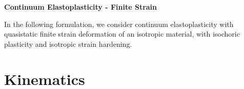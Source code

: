 \documentclass[10pt]{article}
\begin{document}
\def\Bomega{\mbox{\boldmath$\omega$}}
\def\Bvarepsilon{\mbox{\boldmath$\varepsilon$}}
\def\Bvartheta{\mbox{\boldmath$\vartheta$}}
\def\Bvarpi{\mbox{\boldmath$\varpi$}}
\def\Bvarrho{\mbox{\boldmath$\varrho$}}
\def\Bvarsigma{\mbox{\boldmath$\varsigma$}}
\def\Bvarphi{\mbox{\boldmath$\varphi$}}
\def\bone{\mathbf{1}}
\def\bzero{\mathbf{0}}
\def\bA{\mbox{\boldmath$ A$}}
\def\bB{\mbox{\boldmath$ B$}}
\def\bC{\mbox{\boldmath$ C$}}
\def\bD{\mbox{\boldmath$ D$}}
\def\bE{\mbox{\boldmath$ E$}}
\def\bF{\mbox{\boldmath$ F$}}
\def\bG{\mbox{\boldmath$ G$}}
\def\bH{\mbox{\boldmath$ H$}}
\def\bI{\mbox{\boldmath$ I$}}
\def\bJ{\mbox{\boldmath$ J$}}
\def\bK{\mbox{\boldmath$ K$}}
\def\bL{\mbox{\boldmath$ L$}}
\def\bM{\mbox{\boldmath$ M$}}
\def\bN{\mbox{\boldmath$ N$}}
\def\bO{\mbox{\boldmath$ O$}}
\def\bP{\mbox{\boldmath$ P$}}
\def\bQ{\mbox{\boldmath$ Q$}}
\def\bR{\mbox{\boldmath$ R$}}
\def\bS{\mbox{\boldmath$ S$}}
\def\bT{\mbox{\boldmath$ T$}}
\def\bU{\mbox{\boldmath$ U$}}
\def\bV{\mbox{\boldmath$ V$}}
\def\bW{\mbox{\boldmath$ W$}}
\def\bX{\mbox{\boldmath$ X$}}
\def\bY{\mbox{\boldmath$ Y$}}
\def\bZ{\mbox{\boldmath$ Z$}}
\def\ba{\mbox{\boldmath$ a$}}
\def\bb{\mbox{\boldmath$ b$}}
\def\bc{\mbox{\boldmath$ c$}}
\def\bd{\mbox{\boldmath$ d$}}
\def\be{\mbox{\boldmath$ e$}}
\def\bff{\mbox{\boldmath$ f$}}
\def\bg{\mbox{\boldmath$ g$}}
\def\bh{\mbox{\boldmath$ h$}}
\def\bi{\mbox{\boldmath$ i$}}
\def\bj{\mbox{\boldmath$ j$}}
\def\bk{\mbox{\boldmath$ k$}}
\def\bl{\mbox{\boldmath$ l$}}
\def\bm{\mbox{\boldmath$ m$}}
\def\bn{\mbox{\boldmath$ n$}}
\def\bo{\mbox{\boldmath$ o$}}
\def\bp{\mbox{\boldmath$ p$}}
\def\bq{\mbox{\boldmath$ q$}}
\def\br{\mbox{\boldmath$ r$}}
\def\bs{\mbox{\boldmath$ s$}}
\def\bt{\mbox{\boldmath$ t$}}
\def\bu{\mbox{\boldmath$ u$}}
\def\bv{\mbox{\boldmath$ v$}}
\def\bw{\mbox{\boldmath$ w$}}
\def\bx{\mbox{\boldmath$ x$}}
\def\by{\mbox{\boldmath$ y$}}
\def\bz{\mbox{\boldmath$ z$}}
\centerline{\Large{\bf Continuum Elastoplasticity - Finite Strain}}
\bigskip
In the following formulation, we consider continuum elastoplasticity with quasistatic finite strain deformation of an isotropic material, with isochoric plasticity and isotropic strain hardening.

\section{Kinematics}
\end{document}
